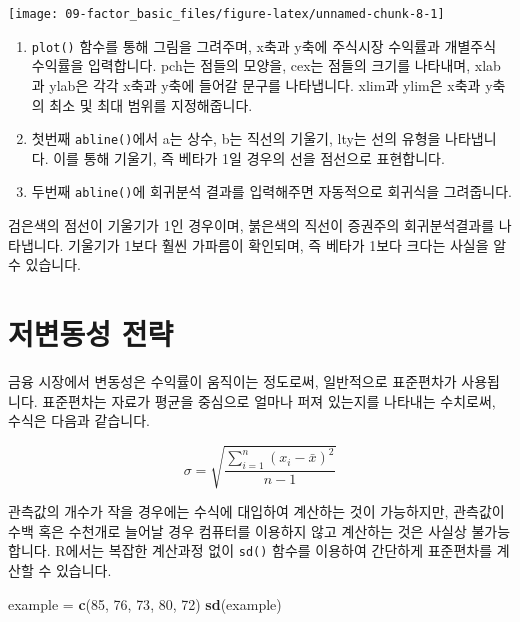 \documentclass[12pt,]{book}
\newenvironment{Shaded}{\begin{snugshade}}{\end{snugshade}}
\newcommand{\DecValTok}[1]{\textcolor[rgb]{0.00,0.00,0.81}{#1}}
\newcommand{\KeywordTok}[1]{\textcolor[rgb]{0.13,0.29,0.53}{\textbf{#1}}}
\newcommand{\NormalTok}[1]{#1}
\newcommand{\StringTok}[1]{\textcolor[rgb]{0.31,0.60,0.02}{#1}}
\providecommand{\tightlist}{%
  \setlength{\itemsep}{0pt}\setlength{\parskip}{0pt}}
\begin{document}
\begin{center}\texttt{[image: 09-factor\_basic\_files/figure-latex/unnamed-chunk-8-1]} \end{center}

\begin{enumerate}
\def\labelenumi{\arabic{enumi}.}
\tightlist
\item
  \texttt{plot()} 함수를 통해 그림을 그려주며, x축과 y축에 주식시장 수익률과 개별주식 수익률을 입력합니다. pch는 점들의 모양을, cex는 점들의 크기를 나타내며, xlab과 ylab은 각각 x축과 y축에 들어갈 문구를 나타냅니다. xlim과 ylim은 x축과 y축의 최소 및 최대 범위를 지정해줍니다.
\item
  첫번째 \texttt{abline()}에서 a는 상수, b는 직선의 기울기, lty는 선의 유형을 나타냅니다. 이를 통해 기울기, 즉 베타가 1일 경우의 선을 점선으로 표현합니다.
\item
  두번째 \texttt{abline()}에 회귀분석 결과를 입력해주면 자동적으로 회귀식을 그려줍니다.
\end{enumerate}

검은색의 점선이 기울기가 1인 경우이며, 붉은색의 직선이 증권주의 회귀분석결과를 나타냅니다. 기울기가 1보다 훨씬 가파름이 확인되며, 즉 베타가 1보다 크다는 사실을 알 수 있습니다.

\hypertarget{section-49}{%
\section{저변동성 전략}\label{section-49}}

금융 시장에서 변동성은 수익률이 움직이는 정도로써, 일반적으로 표준편차가 사용됩니다. 표준편차는 자료가 평균을 중심으로 얼마나 퍼져 있는지를 나타내는 수치로써, 수식은 다음과 같습니다.

\[\sigma = \sqrt{\frac{\sum_{i=1}^{n}{(x_i - \bar{x})^2}}{n-1}}\]

관측값의 개수가 작을 경우에는 수식에 대입하여 계산하는 것이 가능하지만, 관측값이 수백 혹은 수천개로 늘어날 경우 컴퓨터를 이용하지 않고 계산하는 것은 사실상 불가능합니다. R에서는 복잡한 계산과정 없이 \texttt{sd()} 함수를 이용하여 간단하게 표준편차를 계산할 수 있습니다.

\begin{Shaded}
\begin{Highlighting}[]
\NormalTok{example =}\StringTok{ }\KeywordTok{c}\NormalTok{(}\DecValTok{85}\NormalTok{, }\DecValTok{76}\NormalTok{, }\DecValTok{73}\NormalTok{, }\DecValTok{80}\NormalTok{, }\DecValTok{72}\NormalTok{)}
\KeywordTok{sd}\NormalTok{(example)}
\end{Highlighting}
\end{Shaded}
\end{document}

